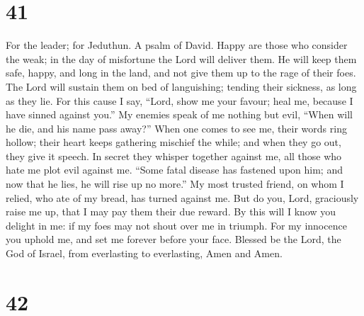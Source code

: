 \hypertarget{section-40}{%
\section{41}\label{section-40}}

For the leader; for Jeduthun. A psalm of David.  Happy are
those who consider the weak; in the day of misfortune the Lord will
deliver them.  He will keep them safe, happy, and long in
the land, and not give them up to the rage of their foes. 
The Lord will sustain them on bed of languishing; tending their
sickness, as long as they lie.  For this cause I say,
``Lord, show me your favour; heal me, because I have sinned against
you.''  My enemies speak of me nothing but evil, ``When will
he die, and his name pass away?''  When one comes to see me,
their words ring hollow; their heart keeps gathering mischief the while;
and when they go out, they give it speech.  In secret they
whisper together against me, all those who hate me plot evil against me.
 ``Some fatal disease has fastened upon him; and now that he
lies, he will rise up no more.''  My most trusted friend, on
whom I relied, who ate of my bread, has turned against me. 
But do you, Lord, graciously raise me up, that I may pay them their due
reward.  By this will I know you delight in me: if my foes
may not shout over me in triumph.  For my innocence you
uphold me, and set me forever before your face.  Blessed be
the Lord, the God of Israel, from everlasting to everlasting, Amen and
Amen.

\hypertarget{section-41}{%
\section{42}\label{section-41}}

